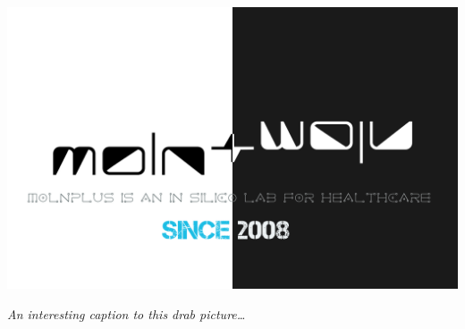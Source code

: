 \documentclass[10pt,a4paper]{article}
\begin{document}
\begin{center}
\vspace{10pt}
\includegraphics[width=0.8\linewidth]{molnplus.png} %
\par\large\textit{An interesting caption to this drab picture\ldots}
\vspace{10pt}
\end{center}
\end{document}
